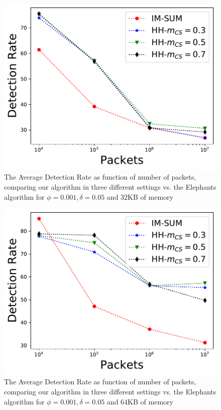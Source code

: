 \begin{figure}
    \centering
    \includegraphics[width=\linewidth]{HH/figures/DR_per_pkts_m=0.03125.pdf}
    \caption[Average Detection Rate for 32KB of memory]{The Average Detection Rate as function of number of packets, comparing our algorithm in three different settings vs. the Elephants algorithm for $\phi=0.001,\delta=0.05$ and 32KB of memory}
    \label{fig:fig2_a}    
\end{figure}

\begin{figure}     \centering
    \includegraphics[width=\linewidth]{HH/figures/DR_per_pkts_m=0.0625.pdf}
        \caption[Average Detection Rate for 64KB of memory]{The Average Detection Rate as function of number of packets, comparing our algorithm in three different settings vs. the Elephants algorithm for $\phi=0.001,\delta=0.05$ and 64KB of memory}
    \label{fig:fig2_b}
\end{figure}

